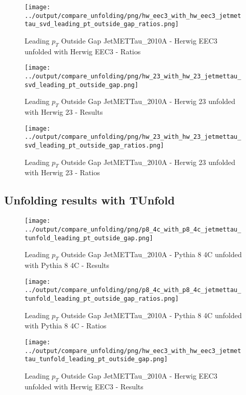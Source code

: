 \documentclass[11pt]{book}
\begin{document}
\begin{figure}[ht]
\centering
\texttt{[image: ../output/compare\_unfolding/png/hw\_eec3\_with\_hw\_eec3\_jetmettau\_svd\_leading\_pt\_outside\_gap\_ratios.png]}
\caption{Leading $p_{T}$ Outside Gap JetMETTau\_2010A - Herwig EEC3 unfolded with Herwig EEC3 - Ratios}
\label{hw_eec3_hw_eec3_jetmettau_svd_leading_pt_outside_gap_b}
\end{figure}

\begin{figure}[ht]
\centering
\texttt{[image: ../output/compare\_unfolding/png/hw\_23\_with\_hw\_23\_jetmettau\_svd\_leading\_pt\_outside\_gap.png]}
\caption{Leading $p_{T}$ Outside Gap JetMETTau\_2010A - Herwig 23 unfolded with Herwig 23 - Results}
\label{hw_23_hw_23_jetmettau_svd_leading_pt_outside_gap_a}
\end{figure}

\begin{figure}[ht]
\centering
\texttt{[image: ../output/compare\_unfolding/png/hw\_23\_with\_hw\_23\_jetmettau\_svd\_leading\_pt\_outside\_gap\_ratios.png]}
\caption{Leading $p_{T}$ Outside Gap JetMETTau\_2010A - Herwig 23 unfolded with Herwig 23 - Ratios}
\label{hw_23_hw_23_jetmettau_svd_leading_pt_outside_gap_b}
\end{figure}


\clearpage
\subsection{Unfolding results with TUnfold}

\begin{figure}[ht]
\centering
\texttt{[image: ../output/compare\_unfolding/png/p8\_4c\_with\_p8\_4c\_jetmettau\_tunfold\_leading\_pt\_outside\_gap.png]}
\caption{Leading $p_{T}$ Outside Gap JetMETTau\_2010A - Pythia 8 4C unfolded with Pythia 8 4C - Results}
\label{p8_p8_jetmettau_tunfold_leading_pt_outside_gap_a}
\end{figure}

\begin{figure}[ht]
\centering
\texttt{[image: ../output/compare\_unfolding/png/p8\_4c\_with\_p8\_4c\_jetmettau\_tunfold\_leading\_pt\_outside\_gap\_ratios.png]}
\caption{Leading $p_{T}$ Outside Gap JetMETTau\_2010A - Pythia 8 4C unfolded with Pythia 8 4C - Ratios}
\label{p8_p8_jetmettau_tunfold_leading_pt_outside_gap_b}
\end{figure}

\begin{figure}[ht]
\centering
\texttt{[image: ../output/compare\_unfolding/png/hw\_eec3\_with\_hw\_eec3\_jetmettau\_tunfold\_leading\_pt\_outside\_gap.png]}
\caption{Leading $p_{T}$ Outside Gap JetMETTau\_2010A - Herwig EEC3 unfolded with Herwig EEC3 - Results}
\label{hw_eec3_hw_eec3_jetmettau_tunfold_leading_pt_outside_gap_a}
\end{figure}
\end{document}
